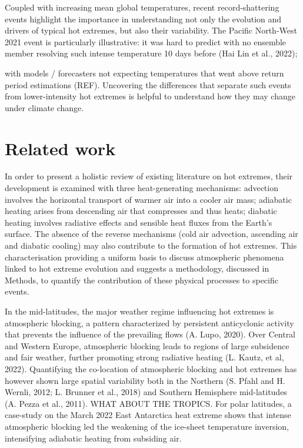 \documentclass[11pt,a4paper,twoside,openright]{report}
\theoremstyle{definition}
\numberwithin{equation}{subsection}
\begin{document}
Coupled with increasing mean global temperatures, recent record-shattering events highlight the importance in understanding not only the evolution and drivers of typical hot extremes, but also their variability. The Pacific North-West 2021 event is particularly illustrative: it was hard to predict with no ensemble member resolving such intense temperature 10 days before (Hai Lin et al., 2022);

with models / forecasters not expecting temperatures that went above return period estimations (REF). Uncovering the differences that separate such events from lower-intensity hot extremes is helpful to understand how they may change under climate change.

\hypertarget{related-work}{%
\section{Related work}\label{related-work}}

In order to present a holistic review of existing literature on hot extremes, their development is examined with three heat-generating mechanisms: advection involves the horizontal transport of warmer air into a cooler air mass; adiabatic heating arises from descending air that compresses and thus heats; diabatic heating involves radiative effects and sensible heat fluxes from the Earth's surface. The absence of the reverse mechanisms (cold air advection, ascending air and diabatic cooling) may also contribute to the formation of hot extremes. This characterisation providing a uniform basis to discuss atmospheric phenomena linked to hot extreme evolution and suggests a methodology, discussed in Methods, to quantify the contribution of these physical processes to specific events.

In the mid-latitudes, the major weather regime influencing hot extremes is atmospheric blocking, a pattern characterized by persistent anticyclonic activity that prevents the influence of the prevailing flows (A. Lupo, 2020). Over Central and Western Europe, atmospheric blocking leads to regions of large subsidence and fair weather, further promoting strong radiative heating (L. Kautz, et al, 2022). Quantifying the co-location of atmospheric blocking and hot extremes has however shown large spatial variability both in the Northern (S. Pfahl and H. Wernli, 2012; L. Brunner et al., 2018) and Southern Hemisphere mid-latitudes (A. Pezza et al., 2011). WHAT ABOUT THE TROPICS. For polar latitudes, a case-study on the March 2022 East Antarctica heat extreme shows that intense atmospheric blocking led the weakening of the ice-sheet temperature inversion, intensifying adiabatic heating from subsiding air.
\end{document}
